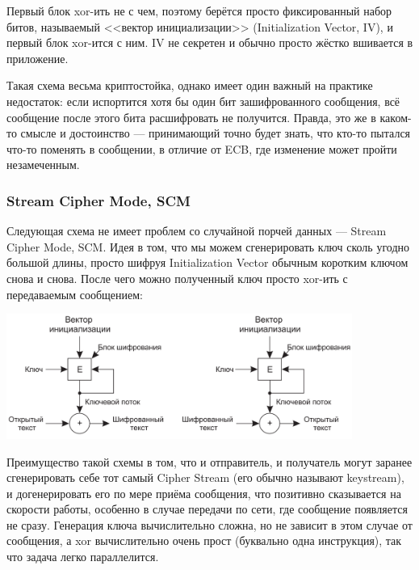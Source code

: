 \documentclass{../../text-style}
\begin{document}
Первый блок xor-ить не с чем, поэтому берётся просто фиксированный набор битов, называемый <<вектор инициализации>> (Initialization Vector, IV), и первый блок xor-ится с ним. IV не секретен и обычно просто жёстко вшивается в приложение.

Такая схема весьма криптостойка, однако имеет один важный на практике недостаток: если испортится хотя бы один бит зашифрованного сообщения, всё сообщение после этого бита расшифровать не получится. Правда, это же в каком-то смысле и достоинство --- принимающий точно будет знать, что кто-то пытался что-то поменять в сообщении, в отличие от ECB, где изменение может пройти незамеченным.

\subsubsection{Stream Cipher Mode, SCM}

Следующая схема не имеет проблем со случайной порчей данных --- Stream Cipher Mode, SCM. Идея в том, что мы можем сгенерировать ключ сколь угодно большой длины, просто шифруя Initialization Vector обычным коротким ключом снова и снова. После чего можно полученный ключ просто xor-ить с передаваемым сообщением: 

\begin{center}
    \includegraphics[width=0.85\textwidth]{scm.png}
\end{center}

Преимущество такой схемы в том, что и отправитель, и получатель могут заранее сгенерировать себе тот самый Cipher Stream (его обычно называют keystream), и догенерировать его по мере приёма сообщения, что позитивно сказывается на скорости работы, особенно в случае передачи по сети, где сообщение появляется не сразу. Генерация ключа вычислительно сложна, но не зависит в этом случае от сообщения, а xor вычислительно очень прост (буквально одна инструкция), так что задача легко параллелится.
\end{document}
